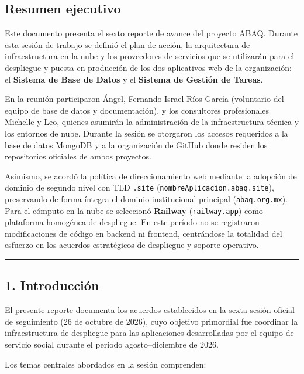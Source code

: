 \documentclass[
]{article}
\begin{document}
\subsection{Resumen ejecutivo}\label{resumen-ejecutivo}

Este documento presenta el sexto reporte de avance del proyecto ABAQ.
Durante esta sesión de trabajo se definió el plan de acción, la
arquitectura de infraestructura en la nube y los proveedores de
servicios que se utilizarán para el despliegue y puesta en producción de
los dos aplicativos web de la organización: el \textbf{Sistema de Base
de Datos} y el \textbf{Sistema de Gestión de Tareas}.

En la reunión participaron Ángel, Fernando Israel Ríos García
(voluntario del equipo de base de datos y documentación), y los
consultores profesionales Michelle y Leo, quienes asumirán la
administración de la infraestructura técnica y los entornos de nube.
Durante la sesión se otorgaron los accesos requeridos a la base de datos
MongoDB y a la organización de GitHub donde residen los repositorios
oficiales de ambos proyectos.

Asimismo, se acordó la política de direccionamiento web mediante la
adopción del dominio de segundo nivel con TLD \texttt{.site}
(\texttt{nombreAplicacion.abaq.site}), preservando de forma íntegra el
dominio institucional principal (\texttt{abaq.org.mx}). Para el cómputo
en la nube se seleccionó \textbf{Railway} (\texttt{railway.app}) como
plataforma homogénea de despliegue. En este período no se registraron
modificaciones de código en backend ni frontend, centrándose la
totalidad del esfuerzo en los acuerdos estratégicos de despliegue y
soporte operativo.

\begin{center}\rule{0.5\linewidth}{0.5pt}\end{center}

\subsection{1. Introducción}\label{introducciuxf3n}

El presente reporte documenta los acuerdos establecidos en la sexta
sesión oficial de seguimiento (26 de octubre de 2026), cuyo objetivo
primordial fue coordinar la infraestructura de despliegue para las
aplicaciones desarrolladas por el equipo de servicio social durante el
período agosto--diciembre de 2026.

Los temas centrales abordados en la sesión comprenden:
\end{document}
